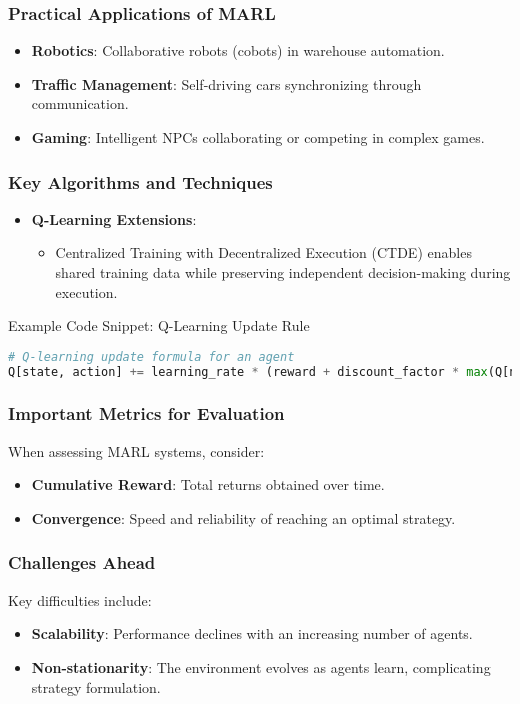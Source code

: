 \documentclass[aspectratio=169]{beamer}
\begin{document}
\begin{frame}
    \frametitle{Practical Applications of MARL}
    \begin{itemize}
        \item \textbf{Robotics}: Collaborative robots (cobots) in warehouse automation.
        \item \textbf{Traffic Management}: Self-driving cars synchronizing through communication.
        \item \textbf{Gaming}: Intelligent NPCs collaborating or competing in complex games.
    \end{itemize}
\end{frame}

\begin{frame}[fragile]
    \frametitle{Key Algorithms and Techniques}
    \begin{itemize}
        \item \textbf{Q-Learning Extensions}: 
        \begin{itemize}
            \item Centralized Training with Decentralized Execution (CTDE) enables shared training data while preserving independent decision-making during execution.
        \end{itemize}
    \end{itemize}
    
    \begin{block}{Example Code Snippet: Q-Learning Update Rule}
    \begin{lstlisting}[language=Python]
# Q-learning update formula for an agent
Q[state, action] += learning_rate * (reward + discount_factor * max(Q[next_state, all_actions]) - Q[state, action])
    \end{lstlisting}
    \end{block}
\end{frame}

\begin{frame}
    \frametitle{Important Metrics for Evaluation}
    When assessing MARL systems, consider:
    \begin{itemize}
        \item \textbf{Cumulative Reward}: Total returns obtained over time.
        \item \textbf{Convergence}: Speed and reliability of reaching an optimal strategy.
    \end{itemize}
\end{frame}

\begin{frame}
    \frametitle{Challenges Ahead}
    Key difficulties include:
    \begin{itemize}
        \item \textbf{Scalability}: Performance declines with an increasing number of agents.
        \item \textbf{Non-stationarity}: The environment evolves as agents learn, complicating strategy formulation.
    \end{itemize}
\end{frame}
\end{document}
